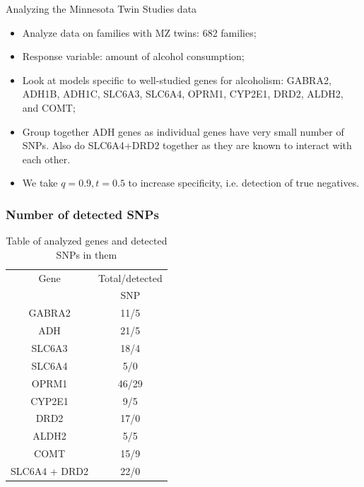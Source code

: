 \documentclass[handout,10pt]{beamer}
\begin{document}
\begin{frame}{Analyzing the Minnesota Twin Studies data}

\begin{itemize}
\item Analyze data on families with MZ twins: 682 families;

\item Response variable: amount of alcohol consumption;

\item Look at models specific to well-studied genes for alcoholism: GABRA2, ADH1B,
ADH1C, SLC6A3, SLC6A4, OPRM1, CYP2E1, DRD2, ALDH2, and COMT;

\item Group together ADH genes as individual genes have very small number of SNPs. Also do SLC6A4+DRD2 together as they are known to interact with each other.

\item We take $q=0.9, t=0.5$ to increase specificity, i.e. detection of true negatives.
\end{itemize}
\end{frame}

\begin{frame}
\frametitle{Number of detected SNPs}

\begin{table}[t]
\begin{footnotesize}
\centering
\begin{tabular}{c|c}
    \hline
    Gene   & Total/detected \\
    ~      & SNP            \\  \hline
GABRA2 &  11/5 \\ 
  ADH &  21/5 \\ 
  SLC6A3 &  18/4 \\ 
  SLC6A4 &   5/0 \\ 
  OPRM1 &  46/29 \\
  CYP2E1 &   9/5 \\ 
  DRD2 &  17/0 \\ 
  ALDH2 &   5/5 \\ 
  COMT &  15/9 \\  
  SLC6A4 + DRD2 & 22/0 \\\hline
\end{tabular}
\caption*{Table of analyzed genes and detected SNPs in them}
\end{footnotesize}
\end{table}
\end{frame}
\end{document}
